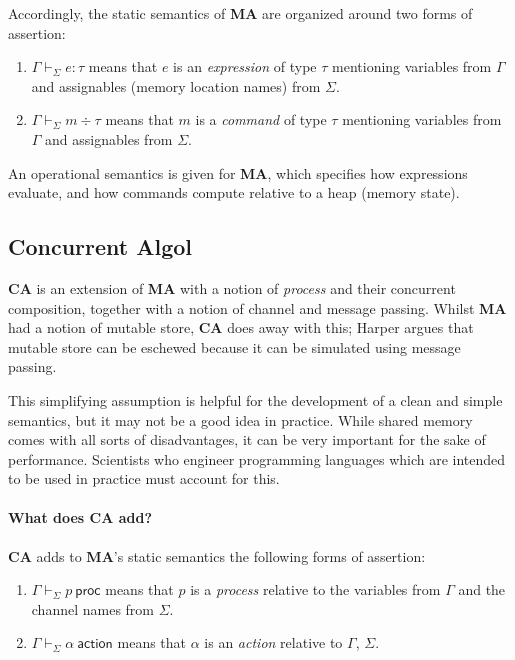 \documentclass{article}
\newcommand\Lang[1]{{\sffamily\bfseries{#1}}}
\newcommand\LangCA{\Lang{CA}}
\newcommand\LangMA{\Lang{MA}}
\newcommand\EOf[4]{{#1}\vdash_{#2}{#3}:{#4}}
\newcommand\MOf[4]{{#1}\vdash_{#2}{#3}\div{#4}}
\newcommand\IsProc[3]{{#1}\vdash_{#2}{#3}\ \mathsf{proc}}
\newcommand\IsAction[3]{{#1}\vdash_{#2}{#3}\ \mathsf{action}}
\begin{document}
Accordingly, the static semantics of \LangMA{} are organized around
two forms of assertion:

\begin{enumerate}
\item $\EOf{\Gamma}{\Sigma}{e}{\tau}$ means that $e$ is an \emph{expression}
  of type $\tau$ mentioning variables from $\Gamma$ and assignables
  (memory location names) from $\Sigma$.
\item $\MOf{\Gamma}{\Sigma}{m}{\tau}$ means that $m$ is a
  \emph{command} of type $\tau$ mentioning variables from $\Gamma$ and
  assignables from $\Sigma$.
\end{enumerate}

An operational semantics is given for \LangMA{}, which specifies how
expressions evaluate, and how commands compute relative to a heap
(memory state).



\subsection{Concurrent Algol}

\LangCA{} is an extension of \LangMA{} with a notion of \emph{process}
and their concurrent composition, together with a notion of channel
and message passing. Whilst \LangMA{} had a notion of mutable store,
\LangCA{} does away with this; Harper argues that mutable store can be
eschewed because it can be simulated using message passing.

This simplifying assumption is helpful for the development of a clean
and simple semantics, but it may not be a good idea in practice. While
shared memory comes with all sorts of disadvantages, it can be very
important for the sake of performance. Scientists who engineer
programming languages which are intended to be used in practice must
account for this.

\paragraph{What does \LangCA{} add?}
\LangCA{} adds to \LangMA{}'s static semantics the following forms of
assertion:
\begin{enumerate}
\item $\IsProc{\Gamma}{\Sigma}{p}$ means that $p$ is a \emph{process}
  relative to the variables from $\Gamma$ and the channel names from
  $\Sigma$.
\item $\IsAction{\Gamma}{\Sigma}{\alpha}$ means that $\alpha$ is an
  \emph{action} relative to $\Gamma$, $\Sigma$.
\end{enumerate}
\end{document}
